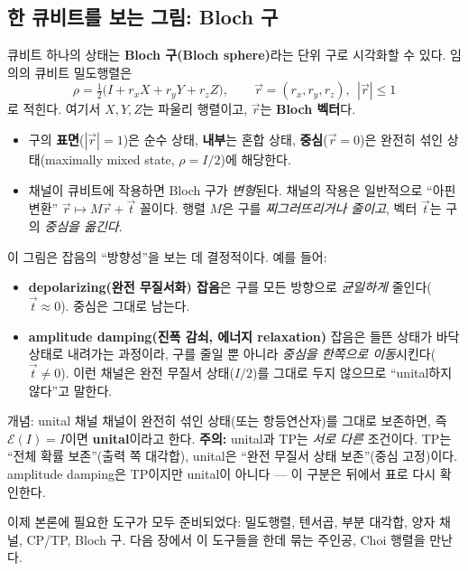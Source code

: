 \documentclass[11pt,a4paper]{article}
\newcommand{\E}{\mathcal{E}}
\begin{document}
\subsection{한 큐비트를 보는 그림: Bloch 구}

큐비트 하나의 상태는 \textbf{Bloch 구(Bloch sphere)}라는 단위 구로 시각화할 수 있다. 임의의 큐비트 밀도행렬은
\[
\rho=\tfrac12\big(I + r_x X + r_y Y + r_z Z\big),\qquad \vec r=(r_x,r_y,r_z),\ \ |\vec r|\le 1
\]
로 적힌다. 여기서 $X,Y,Z$는 파울리 행렬이고, $\vec r$는 \textbf{Bloch 벡터}다.

\begin{itemize}
  \item 구의 \textbf{표면}($|\vec r|=1$)은 순수 상태, \textbf{내부}는 혼합 상태, \textbf{중심}($\vec r=0$)은 완전히 섞인 상태(maximally mixed state, $\rho=I/2$)에 해당한다.
  \item 채널이 큐비트에 작용하면 Bloch 구가 \emph{변형}된다. 채널의 작용은 일반적으로 ``아핀 변환'' $\vec r\mapsto M\vec r+\vec t$ 꼴이다. 행렬 $M$은 구를 \emph{찌그러뜨리거나 줄이고}, 벡터 $\vec t$는 구의 \emph{중심을 옮긴다}.
\end{itemize}

이 그림은 잡음의 ``방향성''을 보는 데 결정적이다. 예를 들어:
\begin{itemize}
  \item \textbf{depolarizing(완전 무질서화) 잡음}은 구를 모든 방향으로 \emph{균일하게} 줄인다($\vec t\approx 0$). 중심은 그대로 남는다.
  \item \textbf{amplitude damping(진폭 감쇠, 에너지 relaxation)} 잡음은 들뜬 상태가 바닥 상태로 내려가는 과정이라, 구를 줄일 뿐 아니라 \emph{중심을 한쪽으로 이동}시킨다($\vec t\neq 0$). 이런 채널은 완전 무질서 상태($I/2$)를 그대로 두지 않으므로 ``unital하지 않다''고 말한다.
\end{itemize}

\begin{conceptbox}{개념: unital 채널}
채널이 완전히 섞인 상태(또는 항등연산자)를 그대로 보존하면, 즉 $\E(I)=I$이면 \textbf{unital}이라고 한다. \textbf{주의:} unital과 TP는 \emph{서로 다른} 조건이다. TP는 ``전체 확률 보존''(출력 쪽 대각합), unital은 ``완전 무질서 상태 보존''(중심 고정)이다. amplitude damping은 TP이지만 unital이 아니다 --- 이 구분은 뒤에서 표로 다시 확인한다.
\end{conceptbox}

이제 본론에 필요한 도구가 모두 준비되었다: 밀도행렬, 텐서곱, 부분 대각합, 양자 채널, CP/TP, Bloch 구. 다음 장에서 이 도구들을 한데 묶는 주인공, Choi 행렬을 만난다.
\end{document}
